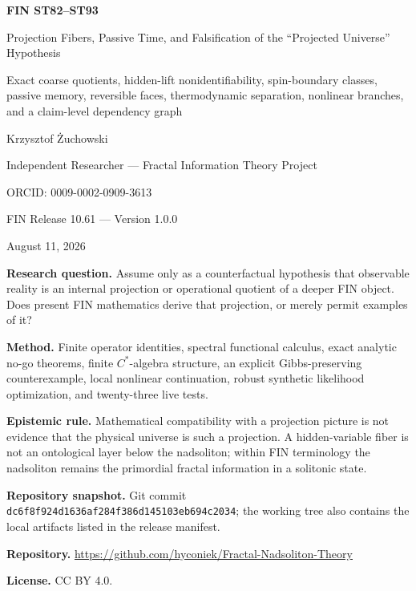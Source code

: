 \documentclass[11pt,a4paper]{article}
\begin{document}
\begin{titlepage}
\centering
\vspace*{1.1cm}
{\LARGE\bfseries FIN ST82--ST93\par}
\vspace{0.35cm}
{\Large Projection Fibers, Passive Time, and Falsification of the ``Projected Universe'' Hypothesis\par}
\vspace{0.42cm}
{\large Exact coarse quotients, hidden-lift nonidentifiability, spin-boundary classes, passive memory, reversible faces, thermodynamic separation, nonlinear branches, and a claim-level dependency graph\par}
\vspace{0.95cm}
{\Large Krzysztof Żuchowski\par}
\vspace{0.24cm}
{\large Independent Researcher --- Fractal Information Theory Project\par}
{\large ORCID: 0009-0002-0909-3613\par}
\vspace{0.75cm}
{\large FIN Release 10.61 --- Version 1.0.0\par}
{\large August 11, 2026\par}
\vfill
\begin{minipage}{0.90\textwidth}
\textbf{Research question.} Assume only as a counterfactual hypothesis that observable reality is an internal projection or operational quotient of a deeper FIN object. Does present FIN mathematics derive that projection, or merely permit examples of it?\par
\textbf{Method.} Finite operator identities, spectral functional calculus, exact analytic no-go theorems, finite $C^*$-algebra structure, an explicit Gibbs-preserving counterexample, local nonlinear continuation, robust synthetic likelihood optimization, and twenty-three live tests.\par
\textbf{Epistemic rule.} Mathematical compatibility with a projection picture is not evidence that the physical universe is such a projection. A hidden-variable fiber is not an ontological layer below the nadsoliton; within FIN terminology the nadsoliton remains the primordial fractal information in a solitonic state.\par
\textbf{Repository snapshot.} Git commit \texttt{dc6f8f924d1636af284f386d145103eb694c2034}; the working tree also contains the local artifacts listed in the release manifest.\par
\textbf{Repository.} \url{https://github.com/hyconiek/Fractal-Nadsoliton-Theory}\par
\textbf{License.} CC BY 4.0.
\end{minipage}
\end{titlepage}
\end{document}
